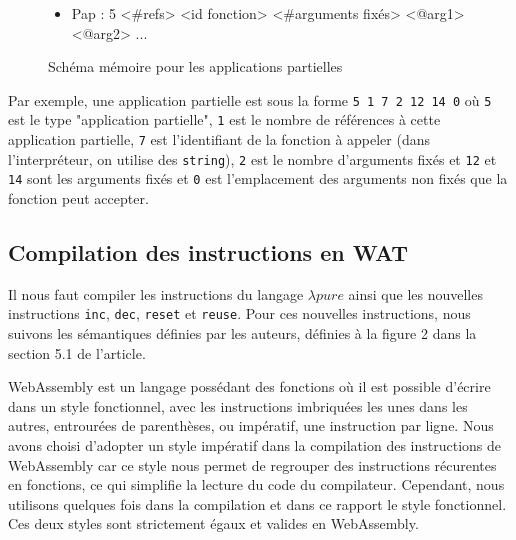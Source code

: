 \documentclass{rapportECL}
\begin{document}
\begin{figure}[H]
	\begin{itemize}
		\item Pap   : 5 <\#refs> <id fonction> <\#arguments fixés> <@arg1> <@arg2> ...
	\end{itemize}
	\caption{Schéma mémoire pour les applications partielles}
	\label{listing:memory_wasm_pap}
\end{figure}

Par exemple, une application partielle est sous la forme \verb|5 1 7 2 12 14 0| où \verb|5| est le type "application partielle", 
\verb|1| est le nombre de références à cette application partielle, 
\verb|7| est l'identifiant de la fonction à appeler (dans l'interpréteur, on utilise des \verb|string|), 
\verb|2| est le nombre d'arguments fixés et \verb|12| et \verb|14| sont les arguments fixés et
\verb|0| est l'emplacement des arguments non fixés que la fonction peut accepter.

\subsection{Compilation des instructions en WAT}

Il nous faut compiler les instructions du langage $\lambda{pure}$ ainsi que les nouvelles instructions \verb|inc|, 
\verb|dec|, \verb|reset| et \verb|reuse|. Pour ces nouvelles instructions, nous suivons les sémantiques définies par les auteurs, 
définies à la figure 2 dans la section 5.1 de l'article\cite{ullrich_counting_2020}.


WebAssembly est un langage possédant des fonctions où il est possible d'écrire dans un style fonctionnel, avec les instructions 
imbriquées les unes dans les autres, entrourées de parenthèses, ou impératif, une instruction par ligne.
Nous avons choisi d'adopter un style impératif dans la compilation des instructions de WebAssembly car ce style nous permet 
de regrouper des instructions récurentes en fonctions, ce qui simplifie la lecture du code du compilateur. Cependant, nous utilisons
quelques fois dans la compilation et dans ce rapport le style fonctionnel.
Ces deux styles sont strictement égaux et valides en WebAssembly.
\end{document}
